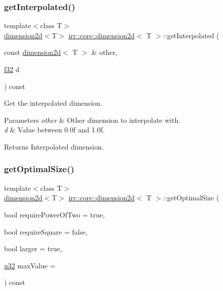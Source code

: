 \subsubsection{\texorpdfstring{get\+Interpolated()}{getInterpolated()}}
{\footnotesize\ttfamily template$<$class T$>$ \\
\hyperlink{classirr_1_1core_1_1dimension2d}{dimension2d}$<$T$>$ \hyperlink{classirr_1_1core_1_1dimension2d}{irr\+::core\+::dimension2d}$<$ T $>$\+::get\+Interpolated (\begin{DoxyParamCaption}\item[{const \hyperlink{classirr_1_1core_1_1dimension2d}{dimension2d}$<$ T $>$ \&}]{other,  }\item[{\hyperlink{namespaceirr_a0277be98d67dc26ff93b1a6a1d086b07}{f32}}]{d }\end{DoxyParamCaption}) const\hspace{0.3cm}{\ttfamily [inline]}}



Get the interpolated dimension. 


\begin{DoxyParams}{Parameters}
{\em other} & Other dimension to interpolate with. \\
\hline
{\em d} & Value between 0.\+0f and 1.\+0f. \\
\hline
\end{DoxyParams}
\begin{DoxyReturn}{Returns}
Interpolated dimension. 
\end{DoxyReturn}
\mbox{\label{classirr_1_1core_1_1dimension2d_a5861f95f79fe5a23a0f2d867b6ca70fc}} 
\subsubsection{\texorpdfstring{get\+Optimal\+Size()}{getOptimalSize()}}
{\footnotesize\ttfamily template$<$class T$>$ \\
\hyperlink{classirr_1_1core_1_1dimension2d}{dimension2d}$<$T$>$ \hyperlink{classirr_1_1core_1_1dimension2d}{irr\+::core\+::dimension2d}$<$ T $>$\+::get\+Optimal\+Size (\begin{DoxyParamCaption}\item[{bool}]{require\+Power\+Of\+Two = {\ttfamily true},  }\item[{bool}]{require\+Square = {\ttfamily false},  }\item[{bool}]{larger = {\ttfamily true},  }\item[{\hyperlink{namespaceirr_a0416a53257075833e7002efd0a18e804}{u32}}]{max\+Value = {} }\end{DoxyParamCaption}) const\hspace{0.3cm}{\ttfamily [inline]}}



